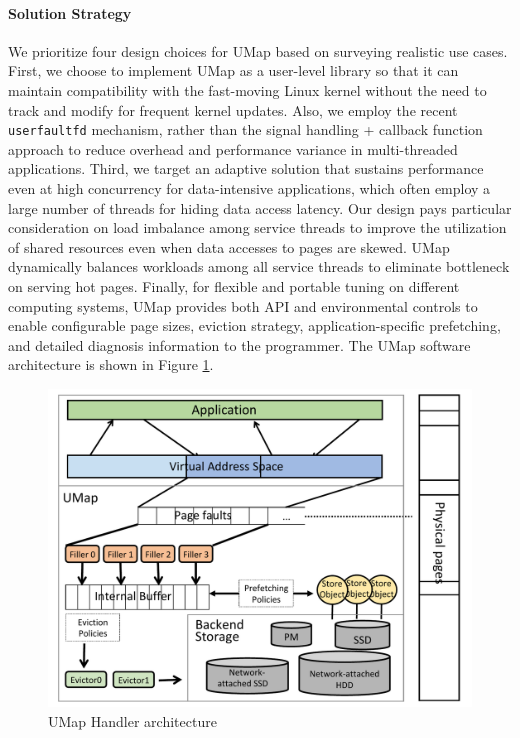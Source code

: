 \paragraph{Solution Strategy}

We prioritize four design choices for UMap based on surveying
realistic use cases. First, we choose to implement UMap as a
user-level library so that it can maintain compatibility with the
fast-moving Linux kernel without the need to track and modify for
frequent kernel updates. Also, we employ the recent \texttt{userfaultfd} 
mechanism, rather than the signal handling + callback function approach
to reduce overhead and performance variance in multi-threaded
applications. Third, we target an adaptive solution that sustains
performance even at high concurrency for data-intensive applications,
which often employ a large number of threads for hiding data access
latency. Our design pays particular consideration on load imbalance
among service threads to improve the utilization of shared resources
even when data accesses to pages are skewed. UMap dynamically balances
workloads among all service threads to eliminate bottleneck on serving
hot pages. Finally, for flexible and portable tuning on different
computing systems, UMap provides both API and environmental controls
to enable configurable page sizes, eviction strategy,
application-specific prefetching, and detailed diagnosis information to the
programmer. The UMap software architecture is shown in Figure
\ref{fig:umaparch}.

\begin{figure}[t]
        \centering
        \includegraphics[scale = 0.5]{projects/2.3.1-PMR/2.3.1.19-Argo-PowerSteering/umap-arch}
        \caption{UMap Handler architecture}
        \label{fig:umaparch}
\end{figure}

